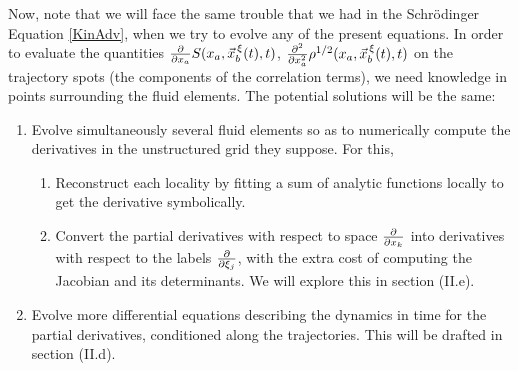 \documentclass[11pt, a4paper]{article} %
\begin{document}
Now, note that we will face the same trouble that we had in the Schrödinger Equation \eqref{KinAdv}, when we try to evolve any of the present equations. In order to evaluate the quantities $\pdv{}{x_a}S(x_a, \vec{x}_b^{\, \xi}(t),t)$, $\pdv[2]{}{x_a}\rho^{1/2}(x_a, \vec{x}_b^{\, \xi}(t),t)$ on the trajectory spots (the components of the correlation terms), we need knowledge in points surrounding the fluid elements. The potential solutions will be the same:\vspace{-0.2cm}
\begin{enumerate}
\item Evolve simultaneously several fluid elements so as to numerically compute the derivatives in the unstructured grid they suppose. For this,\vspace{-0.15cm} \begin{enumerate}
\item Reconstruct each locality by fitting a sum of analytic functions locally to get the derivative symbolically.\vspace{-0.1cm}
\item Convert the partial derivatives with respect to space $\pdv{}{x_k}$ into derivatives with respect to the labels $\pdv{}{\xi_j}$, with the extra cost of computing the Jacobian and its determinants. We will explore this in section (II.e). \vspace{-0.15cm}
\end{enumerate}
\item Evolve more differential equations describing the dynamics in time for the partial derivatives, conditioned along the trajectories. This will be drafted in section (II.d).
\vspace{-0.25cm}
\end{enumerate}
\end{document}
